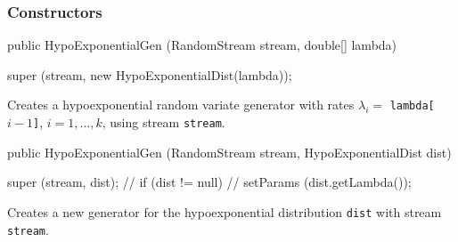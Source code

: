 \subsubsection* {Constructors}
\begin{code}

   public HypoExponentialGen (RandomStream stream, double[] lambda) \begin{hide} {
      super (stream, new HypoExponentialDist(lambda));
   }\end{hide}
\end{code} 
\begin{tabb} Creates a hypoexponential random variate generator with
 rates $\lambda_i = $ \texttt{lambda[$i-1$]}, $i = 1,\ldots,k$,
 using stream \texttt{stream}. 
\end{tabb}
\begin{code}

   public HypoExponentialGen (RandomStream stream, HypoExponentialDist dist) \begin{hide} {
      super (stream, dist);
//      if (dist != null)
//         setParams (dist.getLambda());
   } \end{hide}
\end{code}
 \begin{tabb}  Creates a new generator for the hypoexponential 
   distribution \texttt{dist} with stream \texttt{stream}.   
 \end{tabb}

